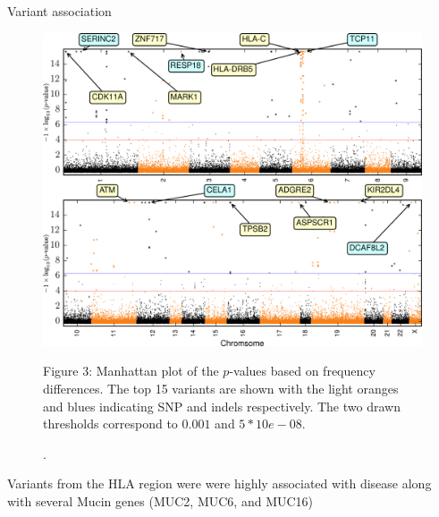 \documentclass[final]{beamer}
\newlength{\onecolwid}
\begin{document}
\begin{frame}[t]
\begin{columns}[t]
\begin{column}{\onecolwid}
\begin{block}{Variant association}
{\begin{figure}
\begin{center}
             \includegraphics[width=7in]{./figs/manhattan-diffs.png}
           \end{center}
           \begin{flushleft}\small{\color{darkblue}Figure 3: \color{black} Manhattan plot of the $p$-values based on frequency differences.  The top 15 variants are shown with the light oranges and blues indicating SNP and indels respectively.  The two drawn thresholds correspond to $0.001$ and $5*10e-08$.}\end{flushleft}.
           \label{fig:manhattan} 
           \end{figure}
           \begin{tcolorbox}
           Variants from the HLA region were were highly associated with disease along with several Mucin genes (MUC2, MUC6, and MUC16)
          \end{tcolorbox} 
          }
           \end{block}
    \end{column}
    

\end{columns}
\end{frame}
\end{document}
